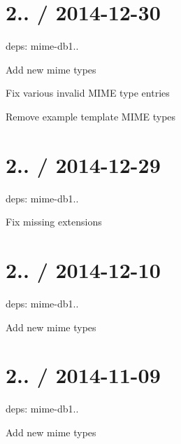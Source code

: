 \section*{2.. / 2014-\/12-\/30 }


\begin{DoxyItemize}
\item deps\+: mime-\/db1..
\begin{DoxyItemize}
\item Add new mime types
\item Fix various invalid M\+I\+ME type entries
\item Remove example template M\+I\+ME types
\end{DoxyItemize}
\end{DoxyItemize}

\section*{2.. / 2014-\/12-\/29 }


\begin{DoxyItemize}
\item deps\+: mime-\/db1..
\begin{DoxyItemize}
\item Fix missing extensions
\end{DoxyItemize}
\end{DoxyItemize}

\section*{2.. / 2014-\/12-\/10 }


\begin{DoxyItemize}
\item deps\+: mime-\/db1..
\begin{DoxyItemize}
\item Add new mime types
\end{DoxyItemize}
\end{DoxyItemize}

\section*{2.. / 2014-\/11-\/09 }


\begin{DoxyItemize}
\item deps\+: mime-\/db1..
\begin{DoxyItemize}
\item Add new mime types
\end{DoxyItemize}
\end{DoxyItemize}

